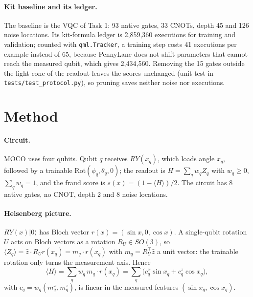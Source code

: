 \documentclass[10pt,twocolumn]{article}
\theoremstyle{definition}
\newcommand{\ex}[1]{\langle #1\rangle}
\begin{document}
\paragraph{Kit baseline and its ledger.} The baseline is the VQC of Task 1: 93 native gates, 33 CNOTs, depth 45
and 126 noise locations. Its kit-formula ledger is 2,859,360 executions for training and validation; counted with
\texttt{qml.Tracker}, a training step costs 41 executions per example instead of 65, because PennyLane does not
shift parameters that cannot reach the measured qubit, which gives 2,434,560.
Removing the 15 gates outside the light cone of the readout leaves the scores unchanged (unit test in
\texttt{tests/test\_protocol.py}), so pruning saves neither noise nor executions.

\section{Method}

\paragraph{Circuit.} MOCO uses four qubits. Qubit $q$ receives $RY(x_q)$, which loads angle $x_q$, followed by a
trainable $\mathrm{Rot}(\phi_q,\theta_q,0)$; the readout is $H=\sum_q w_q Z_q$ with $w_q\ge0$, $\sum_q w_q=1$, and
the fraud score is $s(x)=(1-\ex{H})/2$. The circuit has 8 native gates, no CNOT, depth 2 and 8 noise locations.

\paragraph{Heisenberg picture.} $RY(x)\lvert0\rangle$ has Bloch vector $r(x)=(\sin x,0,\cos x)$. A single-qubit
rotation $U$ acts on Bloch vectors as a rotation $R_U\in SO(3)$, so
$\ex{Z_q}=\hat z\cdot R_U r(x_q)=m_q\cdot r(x_q)$ with $m_q=R_U^{\top}\hat z$ a unit vector: the trainable rotation only
turns the measurement axis. Hence
\begin{equation}
\ex{H}=\sum_q w_q\, m_q\cdot r(x_q)=\sum_q \big(c_q^{x}\sin x_q + c_q^{z}\cos x_q\big),
\label{eq:linear}
\end{equation}
with $c_q=w_q(m_q^x,m_q^z)$, is linear in the measured features $(\sin x_q,\cos x_q)$.
\end{document}
